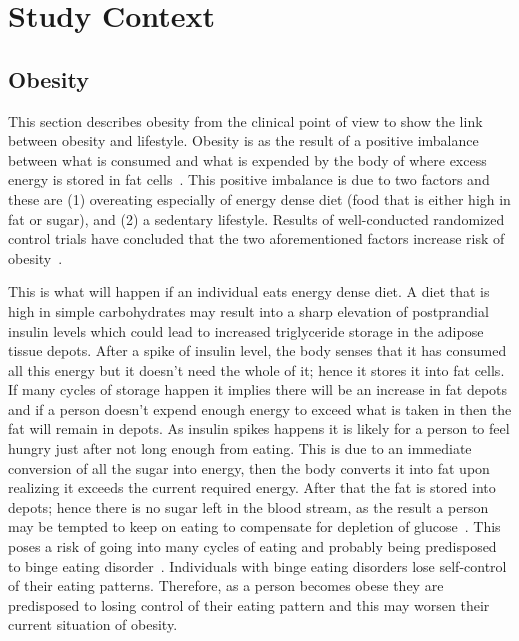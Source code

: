 
\chapter{Study Context} %

\label{contextchapter} %


\section{Obesity}
This section describes obesity from the clinical point of view to show the link between obesity and lifestyle. Obesity is as the  result of a positive imbalance between what is consumed and what is expended by the body of where excess energy is stored in fat cells~\citep{steyn2006chronic}. This positive imbalance is due to two factors and these are (1) overeating especially of energy dense diet (food that is either high in fat or sugar), and (2) a sedentary lifestyle. Results of well-conducted randomized control trials have concluded that the two aforementioned factors increase risk of obesity~\citep{swinburn2004diet}.

This is what will happen if an individual eats energy dense diet. A diet that is high in simple carbohydrates may result into a sharp elevation  of postprandial insulin levels which could lead to increased triglyceride storage in the adipose tissue depots. After a spike of insulin level, the body senses that it has consumed all this energy but it doesn't need the whole of it; hence it stores it into fat cells. If many cycles of storage happen it implies there will be an increase in fat depots and if a person doesn't expend enough energy to exceed what is taken in then the fat will remain in depots. As insulin spikes happens it is likely for a person to feel hungry just after not long enough from eating. This is due to an immediate conversion of all the sugar into energy, then the body converts it into fat upon realizing it exceeds the current required energy. After that the fat is stored into depots; hence there is no sugar left in the blood stream, as the result a person may be tempted to keep on eating to compensate for depletion of glucose~\citep{bouchard1993exercise}. This poses a risk of going into many cycles of eating and probably being predisposed to binge eating disorder~\citep{collins2009behavioral}. Individuals with binge eating disorders lose self-control of their eating patterns. Therefore, as a person becomes obese they are predisposed to losing control of their eating pattern and this may worsen their current situation of obesity. 

